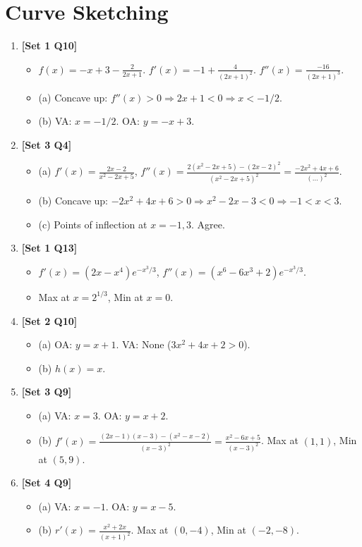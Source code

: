 \documentclass[12pt, a4paper]{article} %
\begin{document}
\section{Curve Sketching}
\begin{enumerate}
    \item \textbf{[Set 1 Q10]}
    \begin{itemize}
        \item $f(x) = -x + 3 - \frac{2}{2x+1}$. $f'(x) = -1 + \frac{4}{(2x+1)^2}$. $f''(x) = \frac{-16}{(2x+1)^3}$.
        \item (a) Concave up: $f''(x) > 0 \Rightarrow 2x+1 < 0 \Rightarrow x < -1/2$.
        \item (b) VA: $x = -1/2$. OA: $y = -x + 3$.
    \end{itemize}

    \item \textbf{[Set 3 Q4]}
    \begin{itemize}
        \item (a) $f'(x) = \frac{2x-2}{x^2-2x+5}$, $f''(x) = \frac{2(x^2-2x+5) - (2x-2)^2}{(x^2-2x+5)^2} = \frac{-2x^2+4x+6}{(\dots)^2}$.
        \item (b) Concave up: $-2x^2+4x+6 > 0 \Rightarrow x^2-2x-3 < 0 \Rightarrow -1 < x < 3$.
        \item (c) Points of inflection at $x=-1, 3$. Agree.
    \end{itemize}

    \item \textbf{[Set 1 Q13]}
    \begin{itemize}
        \item $f'(x) = (2x-x^4)e^{-x^3/3}$, $f''(x) = (x^6-6x^3+2)e^{-x^3/3}$.
        \item Max at $x=2^{1/3}$, Min at $x=0$.
    \end{itemize}

    \item \textbf{[Set 2 Q10]}
    \begin{itemize}
        \item (a) OA: $y = x + 1$. VA: None ($3x^2+4x+2 > 0$).
        \item (b) $h(x) = x$.
    \end{itemize}

    \item \textbf{[Set 3 Q9]}
    \begin{itemize}
        \item (a) VA: $x=3$. OA: $y = x+2$.
        \item (b) $f'(x) = \frac{(2x-1)(x-3) - (x^2-x-2)}{(x-3)^2} = \frac{x^2-6x+5}{(x-3)^2}$. Max at $(1, 1)$, Min at $(5, 9)$.
    \end{itemize}

    \item \textbf{[Set 4 Q9]}
    \begin{itemize}
        \item (a) VA: $x=-1$. OA: $y = x-5$.
        \item (b) $r'(x) = \frac{x^2+2x}{(x+1)^2}$. Max at $(0, -4)$, Min at $(-2, -8)$.
    \end{itemize}
\end{enumerate}
\end{document}
